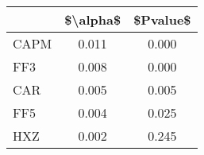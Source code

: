 \begin{tabular}{lcc}
\toprule
{} &  \$\textbackslash alpha\$ &  \$Pvalue\$ \\
\midrule
CAPM &     0.011 &     0.000 \\
FF3  &     0.008 &     0.000 \\
CAR  &     0.005 &     0.005 \\
FF5  &     0.004 &     0.025 \\
HXZ  &     0.002 &     0.245 \\
\bottomrule
\end{tabular}
